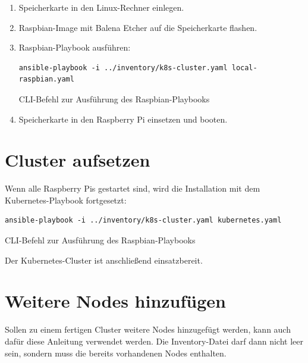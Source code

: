 \begin{enumerate}
    \item Speicherkarte in den Linux-Rechner einlegen.
    \item Raspbian-Image mit Balena Etcher auf die Speicherkarte flashen.
    \item Raspbian-Playbook ausführen:
        \begin{lstlisting}
ansible-playbook -i ../inventory/k8s-cluster.yaml local-raspbian.yaml
        \end{lstlisting}
        \caption{CLI-Befehl zur Ausführung des Raspbian-Playbooks}
    \item Speicherkarte in den Raspberry Pi einsetzen und booten.
\end{enumerate}

\section{Cluster aufsetzen}

Wenn alle Raspberry Pis gestartet sind, wird die Installation mit dem Kubernetes-Playbook fortgesetzt:
\begin{lstlisting}
ansible-playbook -i ../inventory/k8s-cluster.yaml kubernetes.yaml
\end{lstlisting}
\caption{CLI-Befehl zur Ausführung des Raspbian-Playbooks}

Der Kubernetes-Cluster ist anschließend einsatzbereit.

\section{Weitere Nodes hinzufügen}

Sollen zu einem fertigen Cluster weitere Nodes hinzugefügt werden, kann auch dafür diese Anleitung verwendet werden.
Die Inventory-Datei darf dann nicht leer sein, sondern muss die bereits vorhandenen Nodes enthalten.

